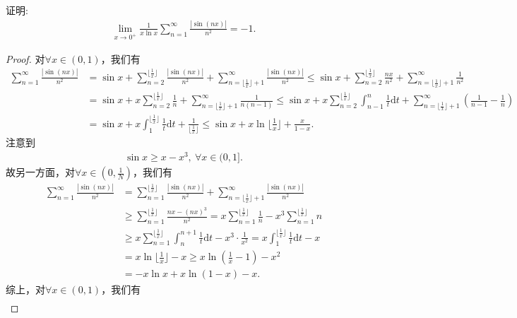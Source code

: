 \documentclass[../../main.tex]{subfiles}
\begin{document}
\begin{example}
证明:
\begin{align*}
\lim_{x \to 0^+} \frac{1}{x \ln x} \sum_{n=1}^{\infty} \frac{|\sin(nx)|}{n^2} = -1.
\end{align*}
\end{example}
\begin{proof}
对$\forall x\in (0,1)$，我们有
\begin{align*}
\sum_{n=1}^{\infty}\frac{|\sin(nx)|}{n^2} &= \sin x + \sum_{n=2}^{\lfloor \frac{1}{x} \rfloor}\frac{|\sin(nx)|}{n^2} + \sum_{n=\lfloor \frac{1}{x} \rfloor +1}^{\infty}\frac{|\sin(nx)|}{n^2} \leqslant \sin x + \sum_{n=2}^{\lfloor \frac{1}{x} \rfloor}\frac{nx}{n^2} + \sum_{n=\lfloor \frac{1}{x} \rfloor +1}^{\infty}\frac{1}{n^2} \\
&= \sin x + x\sum_{n=2}^{\lfloor \frac{1}{x} \rfloor}\frac{1}{n} + \sum_{n=\lfloor \frac{1}{x} \rfloor +1}^{\infty}\frac{1}{n(n-1)} \leqslant \sin x + x\sum_{n=2}^{\lfloor \frac{1}{x} \rfloor}\int_{n-1}^n\frac{1}{t}\mathrm{d}t + \sum_{n=\lfloor \frac{1}{x} \rfloor +1}^{\infty}\left( \frac{1}{n-1} - \frac{1}{n} \right) \\
&= \sin x + x\int_1^{\lfloor \frac{1}{x} \rfloor}\frac{1}{t}\mathrm{d}t + \frac{1}{\lfloor \frac{1}{x} \rfloor} \leqslant \sin x + x\ln \lfloor \frac{1}{x} \rfloor + \frac{x}{1-x}.
\end{align*}
注意到
\begin{align*}
\sin x\geqslant x-x^3,\ \forall x\in (0,1].
\end{align*}
故另一方面，对$\forall x\in (0,\frac{1}{N})$，我们有
\begin{align*}
\sum_{n=1}^{\infty}\frac{|\sin(nx)|}{n^2}&=\sum_{n=1}^{\lfloor \frac{1}{x} \rfloor}\frac{|\sin(nx)|}{n^2}+\sum_{n=\lfloor \frac{1}{x} \rfloor +1}^{\infty}\frac{|\sin(nx)|}{n^2} \\
&\geqslant \sum_{n=1}^{\lfloor \frac{1}{x} \rfloor}\frac{nx-(nx)^3}{n^2}=x\sum_{n=1}^{\lfloor \frac{1}{x} \rfloor}\frac{1}{n}-x^3\sum_{n=1}^{\lfloor \frac{1}{x} \rfloor}n \\
&\geqslant x\sum_{n=1}^{\lfloor \frac{1}{x} \rfloor}\int_n^{n+1}\frac{1}{t}\mathrm{d}t-x^3\cdot \frac{1}{x^2}=x\int_1^{\lfloor \frac{1}{x} \rfloor}\frac{1}{t}\mathrm{d}t-x \\
&=x\ln \lfloor \frac{1}{x} \rfloor -x\geqslant x\ln \left( \frac{1}{x}-1 \right) -x^2\\
&=-x\ln x+x\ln \left( 1-x \right) -x.
\end{align*}
综上，对$\forall x\in (0,1)$，我们有
\begin{align*}

\end{align*}
\end{proof}
\end{document}
